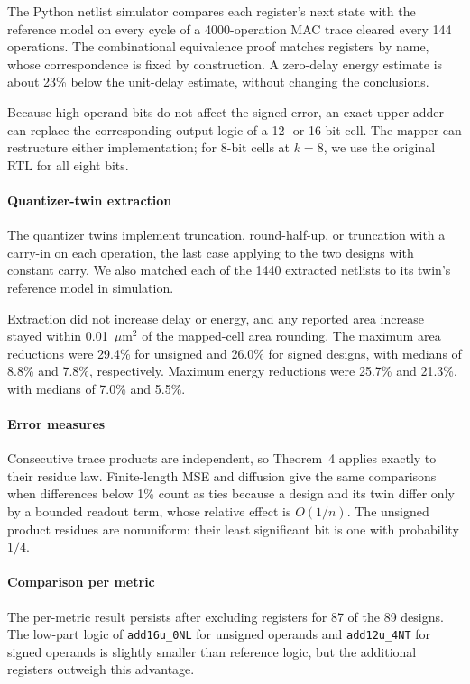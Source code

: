 \documentclass[11pt]{article}
\begin{document}
The Python netlist simulator compares each register's next state
with the reference model on every cycle of a 4000-operation MAC trace
cleared every 144 operations. The combinational equivalence proof matches
registers by name, whose correspondence is fixed by construction. A
zero-delay energy estimate is about 23\% below the unit-delay estimate,
without changing the conclusions.

Because high operand bits do not affect the signed error, an exact upper
adder can replace the corresponding output logic of a 12- or 16-bit cell.
The mapper can restructure either implementation;
for 8-bit cells at $k=8$, we use the original RTL for all eight bits.

\paragraph{Quantizer-twin extraction}
The quantizer twins implement truncation, round-half-up, or truncation with
a carry-in on each operation, the last case applying to the two designs
with constant carry. We also matched each of the 1440 extracted netlists
to its twin's reference model in simulation.

Extraction did not increase delay or energy, and any reported area
increase stayed within 0.01~$\mu$m$^2$ of the mapped-cell area rounding. The
maximum area reductions were 29.4\% for unsigned and 26.0\% for signed
designs, with medians of 8.8\% and 7.8\%, respectively. Maximum energy
reductions were 25.7\% and 21.3\%, with medians of 7.0\% and 5.5\%.

\paragraph{Error measures}
Consecutive trace products are independent, so Theorem~4 applies exactly to
their residue law. Finite-length MSE and diffusion give the same comparisons
when differences below 1\% count as ties because a design and its twin differ only
by a bounded readout term, whose relative effect is $O(1/n)$. The unsigned
product residues are nonuniform: their least significant bit is one with
probability $1/4$.

\paragraph{Comparison per metric}
The per-metric result persists after excluding registers for 87 of the 89
designs. The low-part logic of \texttt{add16u\_0NL} for unsigned operands
and \texttt{add12u\_4NT} for signed operands is slightly smaller than
reference logic, but the additional registers outweigh this advantage.
\end{document}
